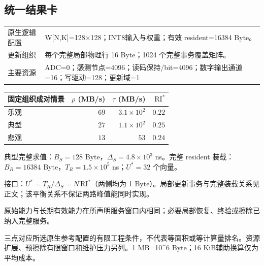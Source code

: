 \subsection*{统一结果卡}
\begingroup\small
\noindent\begin{tabularx}{\textwidth}{@{}p{24mm}X@{}}\toprule
原生逻辑配置 & W[N,K]=128×128；INT8输入与权重；有效 resident=16384 Byte。\\
更新组织 & 每个完整局部物理行 16 Byte；1024 个完整事务覆盖矩阵。\\
主要资源 & ADC=0；感测节点=4096；读码保持/bit=4096；数字输出通道=16；写驱动=128；更新域=1\\
\bottomrule\end{tabularx}
\vspace{3mm}
\begin{center}\begin{tabular}{@{}lrrr@{}}\toprule
固定组织成对情景 & $\rho$ (MB/s) & $\tau$ (MB/s) & $\mathrm{RI}^{*}$\\\midrule
乐观 & $69$ & $3.1\times10^{2}$ & $0.22$\\
典型 & $27$ & $1.1\times10^{2}$ & $0.25$\\
悲观 & $13$ & $53$ & $0.24$\\
\bottomrule\end{tabular}\end{center}
\noindent 典型完整求值：$B_S=128$ Byte，$\Delta_S=4.8\times10^{3}$ ns。完整 resident 装载：$B_R=16384$ Byte，$T_R=1.5\times10^{5}$ ns；$U^*=32$ 个向量。
\par\smallskip\noindent 接口：$U^*=T_R/\Delta_S=N\,\mathrm{RI}^*$（两侧均为 1 Byte）。局部更新事务与完整装载关系见正文；该平衡关系不保证两路峰值能同时实现。
\par\smallskip\noindent 原始能力与长期有效能力在所声明服务窗口内相同；必要局部恢复、终验或擦除已纳入完整服务。
\par\smallskip\noindent 三点对应所选原生参考配置的有限工程条件，不代表等面积或等计算量排名。资源扩展、预擦除有限窗口和维护压力另列。1 MB=10\textasciicircum{}6 Byte；16 KiB辅助换算仅为平均成本。
\endgroup
\clearpage
